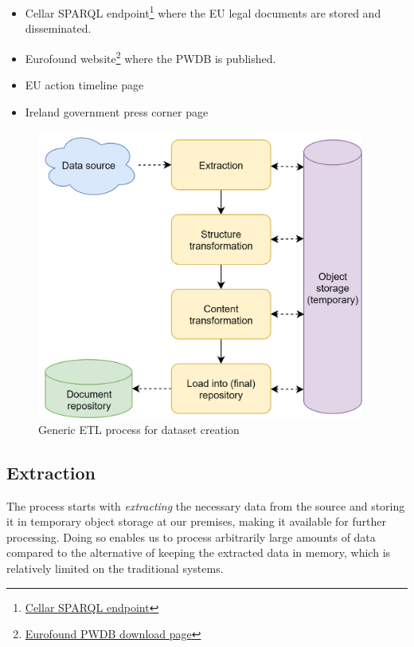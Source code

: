 \begin{itemize}
	\item Cellar SPARQL endpoint\footnote{ \href{http://publications.europa.eu/webapi/rdf/sparql}{Cellar SPARQL endpoint} } where the EU legal documents are stored and disseminated. 
	\item Eurofound website\footnote{ \href{https://www.eurofound.europa.eu/data/covid-19-eu-policywatch}{Eurofound PWDB download page} } where the PWDB is published.
	\item EU action timeline page

	\item Ireland government press corner page
\end{itemize}

\begin{Center}
\begin{figure}[h]
	\begin{Center}
		\includegraphics[width=4.24in,height=3.75in]{images/image5.png}
		\caption{Generic ETL process for dataset creation}
		\label{fig:Generic_ETL_process_for_dataset_creation}
	\end{Center}
\end{figure}
\end{Center}

\subsection{Extraction}

The process starts with \textit{extracting} the necessary data from the source and storing it in temporary object storage at our premises, making it available for further processing. Doing so enables us to process arbitrarily large amounts of data compared to the alternative of keeping the extracted data in memory, which is relatively limited on the traditional systems. 

